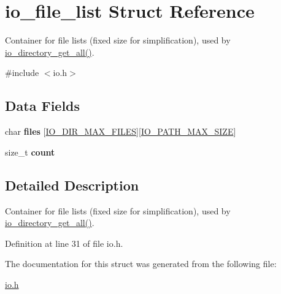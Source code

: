 \hypertarget{structio__file__list}{}\section{io\+\_\+file\+\_\+list Struct Reference}
\label{structio__file__list}


Container for file lists (fixed size for simplification), used by \hyperlink{io_8c_adb8d68b54b043f5118a4cbfd49a8ec51}{io\+\_\+directory\+\_\+get\+\_\+all()}.  




{\ttfamily \#include $<$io.\+h$>$}

\subsection*{Data Fields}
\begin{DoxyCompactItemize}
\item 
char {\bfseries files} \mbox{[}\hyperlink{io_8h_a467d28fd66a94e856cb73b80110d730a}{I\+O\+\_\+\+D\+I\+R\+\_\+\+M\+A\+X\+\_\+\+F\+I\+L\+ES}\mbox{]}\mbox{[}\hyperlink{io_8h_a3459a8a15f99dc120380d828bc7a4cd8}{I\+O\+\_\+\+P\+A\+T\+H\+\_\+\+M\+A\+X\+\_\+\+S\+I\+ZE}\mbox{]}\hypertarget{structio__file__list_aea2e7d487e7a0ce1737212bb7679dbcc}{}\label{structio__file__list_aea2e7d487e7a0ce1737212bb7679dbcc}

\item 
size\+\_\+t {\bfseries count}\hypertarget{structio__file__list_a76d971a3c552bc58ba9f0d5fceae9806}{}\label{structio__file__list_a76d971a3c552bc58ba9f0d5fceae9806}

\end{DoxyCompactItemize}


\subsection{Detailed Description}
Container for file lists (fixed size for simplification), used by \hyperlink{io_8c_adb8d68b54b043f5118a4cbfd49a8ec51}{io\+\_\+directory\+\_\+get\+\_\+all()}. 

Definition at line 31 of file io.\+h.



The documentation for this struct was generated from the following file\+:\begin{DoxyCompactItemize}
\item 
\hyperlink{io_8h}{io.\+h}\end{DoxyCompactItemize}
